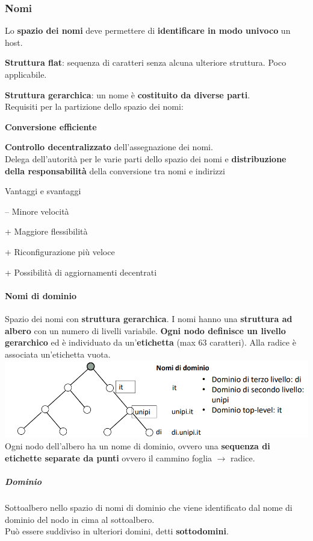 \documentclass[10pt]{article}
\begin{document}
\subsubsection{Nomi}
Lo \textbf{spazio dei nomi} deve permettere di \textbf{identificare in modo univoco} un host.
\begin{list}{}{}
\item \textbf{Struttura flat}: sequenza di caratteri senza alcuna ulteriore struttura. Poco applicabile.
\item \textbf{Struttura gerarchica}: un nome è \textbf{costituito da diverse parti}.\\Requisiti per la partizione dello spazio dei nomi:
\begin{list}{}{}
\item \textbf{Conversione efficiente}
\item \textbf{Controllo decentralizzato} dell'assegnazione dei nomi.\\Delega dell'autorità per le varie parti dello spazio dei nomi e \textbf{distribuzione della responsabilità} della conversione tra nomi e indirizzi
\end{list}
Vantaggi e svantaggi
\begin{list}{}{}
\item -- Minore velocità
\item + Maggiore flessibilità
\item + Riconfigurazione più veloce
\item + Possibilità di aggiornamenti decentrati
\end{list}
\end{list}
\pagebreak
\paragraph{Nomi di dominio} Spazio dei nomi con \textbf{struttura gerarchica}. I nomi hanno una \textbf{struttura ad albero} con un numero di livelli variabile. \textbf{Ogni nodo definisce un livello gerarchico} ed è individuato da un'\textbf{etichetta} (max 63 caratteri). Alla radice è associata un'etichetta vuota.\\
\includegraphics[scale=0.7]{nomidominio.png}\\
Ogni nodo dell'albero ha un nome di dominio, ovvero una \textbf{sequenza di etichette separate da punti} ovvero il cammino foglia $\rightarrow$ radice.
\subparagraph{Dominio} Sottoalbero nello spazio di nomi di dominio che viene identificato dal nome di dominio del nodo in cima al sottoalbero.\\Può essere suddiviso in ulteriori domini, detti \textbf{sottodomini}.
\end{document}
